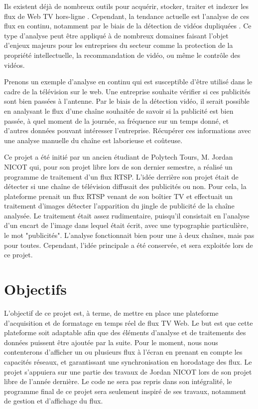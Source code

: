 \documentclass{polytech/polytech}
\begin{document}
Ils existent déjà de nombreux outils pour acquérir, stocker, traiter et indexer les flux de Web TV hors-ligne \cite{abduraman_tv_2012}. Cependant, la tendance actuelle est l’analyse de ces flux en continu, notamment par le biais de la détection de vidéos dupliquées \cite{liu_near-duplicate_2013}. Ce type d’analyse peut être appliqué à de nombreux domaines faisant l’objet d’enjeux majeurs pour les entreprises du secteur comme la protection de la propriété intellectuelle, la recommandation de vidéo, ou même le contrôle des vidéos.


Prenons un exemple d’analyse en continu qui est susceptible d’être utilisé dans le cadre de la télévision sur le web. Une entreprise souhaite vérifier si ces publicités sont bien passées à l’antenne. Par le biais de la détection vidéo, il serait possible en analysant le flux d’une chaîne souhaitée de savoir si la publicité est bien passée, à quel moment de la journée, sa fréquence sur un temps donné, et d’autres données pouvant intéresser l’entreprise. Récupérer ces informations avec une analyse manuelle du chaîne est laborieuse et coûteuse.

Ce projet a été initié par un ancien étudiant de Polytech Tours, M. Jordan NICOT qui, pour son projet libre lors de son dernier semestre, a réalisé un programme de traitement d’un flux RTSP. L’idée derrière son projet était de détecter si une chaîne de télévision diffusait des publicités ou non. Pour cela, la plateforme prenait un flux RTSP venant de son boîtier TV et effectuait un traitement d’images détecter l’apparition du jingle de publicité de la chaîne analysée. Le traitement était assez rudimentaire, puisqu’il consistait en l’analyse d’un encart de l’image dans lequel était écrit, avec une typographie particulière, le mot "publicités". L’analyse fonctionnait bien pour une à deux chaînes, mais pas pour toutes. Cependant, l’idée principale a été conservée, et sera exploitée lors de ce projet.


\section{Objectifs}

L’objectif de ce projet est, à terme, de mettre en place une plateforme d’acquisition et de formatage en temps réel de flux TV Web. Le but est que cette plateforme soit adaptable afin que des éléments d’analyse et de traitements des données puissent être ajoutée par la suite. Pour le moment, nous nous contenterons d’afficher un ou plusieurs flux à l’écran en prenant en compte les capacités réseaux, et garantissant une synchronisation en horodatage des flux. Le projet s’appuiera sur une partie des travaux de Jordan NICOT lors de son projet libre de l’année dernière. Le code ne sera pas repris dans son intégralité, le programme final de ce projet sera seulement inspiré de ses travaux, notamment de gestion et d’affichage du flux. 
\end{document}
